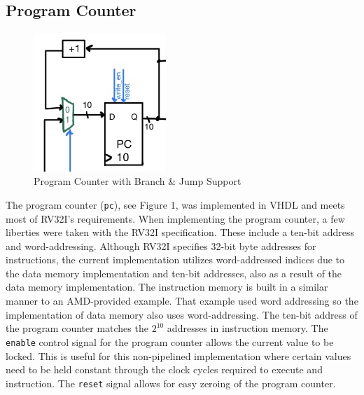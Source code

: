 \documentclass[lettersize,journal]{IEEEtran}
\begin{document}
\subsection{Program Counter}
\begin{figure}[!h]
  \label{fig:pc}
  \centering
  \includegraphics[width=5cm]{PC.jpg}
  \caption{Program Counter with Branch \& Jump Support}
\end{figure}
The program counter (\verb|pc|), see Figure 1, was implemented in VHDL and meets most of RV32I's requirements.
When implementing the program counter, a few liberties were taken with the RV32I specification.
These include a ten-bit address and word-addressing.
Although RV32I specifies 32-bit byte addresses for instructions, the current implementation utilizes word-addressed indices 
due to the data memory implementation and ten-bit addresses, also as a result of the data memory implementation.
The instruction memory is built in a similar manner to an AMD-provided example.
That example used word addressing so the implementation of data memory also uses word-addressing.
The ten-bit address of the program counter matches the $2^{10}$ addresses in instruction memory.
The \verb|enable| control signal for the program counter allows the current value to be locked.
This is useful for this non-pipelined implementation where certain values need to be held constant through the clock cycles required to execute and instruction.
The \verb|reset| signal allows for easy zeroing of the program counter. 
\end{document}
